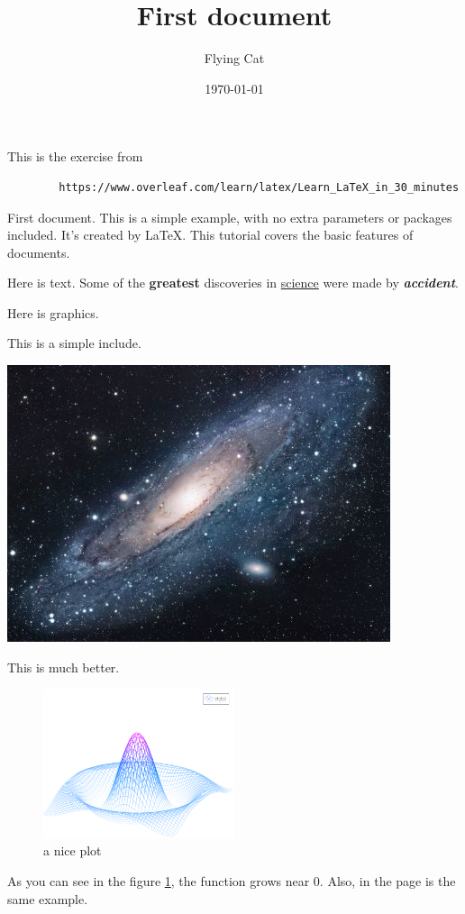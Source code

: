 \documentclass[12pt, letterpaper]{article} %
\title{First document}
\author{Flying Cat}
\date{\today}
\begin{document}
	\maketitle %
	
	This is the exercise from 
	\begin{verbatim} 
		https://www.overleaf.com/learn/latex/Learn_LaTeX_in_30_minutes 
	\end{verbatim}

	
	\noindent
	First document. This is a simple example, with no extra parameters or packages included. It's 
	created by \LaTeX{}. This tutorial covers the basic features of documents.
	
	Here is text. Some of the \textbf{greatest} discoveries in \underline{science} were made by 
	\textbf{\textit{accident}}.
	
	Here is graphics.
	
	This is a simple include.
	
	\includegraphics{universe}
	
	This is much better.
	
	\begin{figure}[h] 
		\centering
		\includegraphics[width=0.5\textwidth]{mesh}
		\caption{a nice plot} %
		\label{fig:mesh1} %
	\end{figure}
	
	As you can see in the figure \ref{fig:mesh1}, the function grows near 0. Also, in the page 
	\pageref{fig:mesh1} is the same example.
	
	
\end{document}

